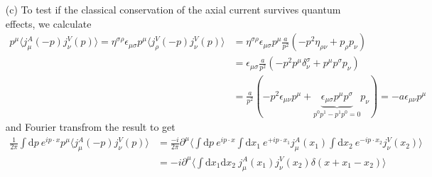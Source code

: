 \documentclass[10pt, a4paper]{article}
\begin{document}
{\begin{enumerate}
\begin{align*}
    &= (\partial_\mu \bar{\psi}) \gamma^1 \gamma^0 \gamma^{\mu} \psi +  \bar{\psi} \gamma^1 \gamma^0 \gamma^{\mu} (\partial_\mu \psi) = 0
  \end{align*}
  where we used the property $\epsilon_{\mu\nu} \gamma^{\nu} =\eta_{\mu \sigma} \gamma^1 \gamma^0 \gamma^{\sigma}$, the classical equation of motion for a free massless fermion field $0 = \gamma^1 \gamma^0 \gamma^{\mu} \partial_\mu \psi$ and its conjugate $0 =  \partial_\mu \psi^\dagger \gamma^0 \gamma^1 \gamma^0 \gamma^{\mu} \gamma^0 = \partial_\mu \bar{\psi} \gamma^1 \gamma^0 \gamma^{\mu} \gamma^0$. We explicitly check 
  \begin{align*}
    \gamma^{1} &= \epsilon_{01} \gamma^{1} =  \eta_{00} \gamma^1 \gamma^0 \gamma^{0} = (\eta_{00}\eta^{00}) \gamma^1 = \gamma^1,\\
    -\gamma^{0} &= \epsilon_{10} \gamma^{0} = \eta_{11} \gamma^1 \gamma^0 \gamma^{1} = -(\eta_{11} \eta^{11})\gamma^0 = -\gamma^0.
  \end{align*}
  We conclude that the classical equations of motion imply both the classical conservation of the vector current and the classical conservation of the axial current. 
  \item[(c)] To test if the classical conservation of the axial current survives quantum effects, we calculate 
  \begin{align*}
    p^\mu \langle j^A_\mu (-p) j^V_\nu (p) \rangle = \eta^{\sigma \rho}\epsilon_{\mu\sigma}p^\mu \langle j^V_\rho (-p) j^V_\nu (p) \rangle &= \eta^{\sigma \rho}\epsilon_{\mu\sigma}p^\mu \frac{a}{p^2}\left(-p^2\eta_{\rho\nu} + p_\rho p_\nu\right)\\
    &= \epsilon_{\mu\sigma} \frac{a}{p^2}\left(-p^2 p^\mu \delta_{\nu}^{\sigma} + p^\mu p^\sigma p_\nu \right)\\
    &= \frac{a}{p^2}(-p^2  \epsilon_{\mu\nu} p^\mu + \underbrace{\epsilon_{\mu\sigma} p^\mu p^\sigma}_{p^0 p^1 - p^1 p^0 = 0} p_\nu ) = -a\epsilon_{\mu\nu} p^\mu
  \end{align*}
  and Fourier transfrom the result to get 
  \begin{align*}
    \frac{1}{2\pi}\int \text{d}p\ e^{i p \cdot x}  p^\mu \langle j^A_\mu (-p) j^V_\nu (p) \rangle &= \frac{-i}{2\pi} \partial^\mu \langle \int \text{d}p \ e^{i p \cdot x} \int \text{d}x_1 \ e^{+ i p \cdot x_1} j_{\mu}^{A}(x_1)  \int \text{d}x_2\ e^{- i p \cdot x_2} j_{\nu}^{V}(x_2) \rangle \\
    &= -i \partial^\mu \langle \int \text{d}x_1 \text{d}x_2 \  j_{\mu}^{A}(x_1) j_{\nu}^{V}(x_2) \delta(x + x_1 - x_2)\rangle \\

\end{align*}
\end{enumerate}}
\end{document}

